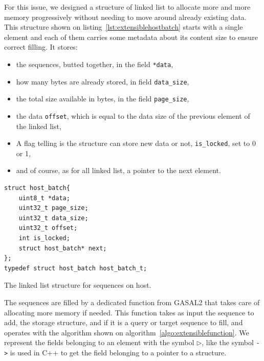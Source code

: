 For this issue, we designed a structure of linked list to allocate more and more memory progressively without needing to move around already existing data. This structure shown on listing~\ref{lst:extensiblehostbatch} starts with a single element and each of them carries some metadata about its content size to ensure correct filling. It stores:

\begin{itemize}
	\item the sequences, butted together, in the field \verb|*data|,
	\item how many bytes are already stored, in field \verb|data_size|,
	\item the total size available in bytes, in the field \verb|page_size|,
	\item the data \verb|offset|, which is equal to the data size of the previous element of the linked list,
	\item A flag telling is the structure can store new data or not, \verb|is_locked|, set to 0 or 1,
	\item and of course, as for all linked list, a pointer to the next element.
\end{itemize}

\begin{listing}[h!]
	\begin{verbatim}
struct host_batch{
	uint8_t *data;
	uint32_t page_size;
	uint32_t data_size;
	uint32_t offset;
	int is_locked;
	struct host_batch* next;
};
typedef struct host_batch host_batch_t;
	\end{verbatim}
\caption{The linked list structure for sequences on host.}
\label{lst:extensiblehostbatch}
\end{listing}

The sequences are filled by a dedicated function from GASAL2 that takes care of allocating more memory if needed. This function takes as input the sequence to add, the storage structure, and if it is a query or target sequence to fill, and operates with the algorithm shown on algorithm~\ref{algo:extensiblefunction}. We represent the fields belonging to an element with the symbol $\rhd$, like the symbol \verb|->| is used in C++ to get the field belonging to a pointer to a structure.


